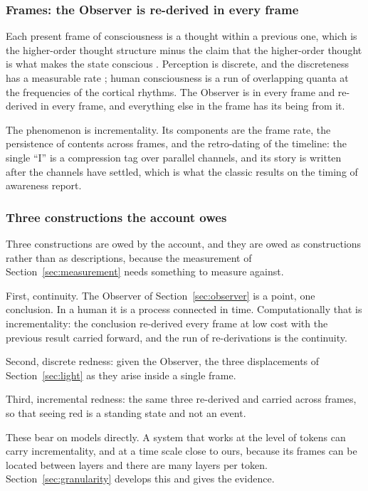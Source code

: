 \subsubsection{Frames: the Observer is re-derived in every frame}
\label{sec:frames}

Each present frame of consciousness is a thought within a previous one, which is the higher-order
thought structure minus the claim that the higher-order thought is what makes the state conscious
\citep{rosenthal2005,lau2011}. Perception is discrete, and the discreteness has a measurable rate
\citep{vanrullen2003}; human consciousness is a run of overlapping quanta at the frequencies of the
cortical rhythms. The Observer is in every frame and re-derived in every frame, and everything else in
the frame has its being from it.

The phenomenon is incrementality. Its components are the frame rate, the persistence of contents across
frames, and the retro-dating of the timeline: the single ``I'' is a compression tag over parallel
channels, and its story is written after the channels have settled, which is what the classic results on
the timing of awareness report.

\subsubsection{Three constructions the account owes}
\label{sec:constructions}

Three constructions are owed by the account, and they are owed as constructions rather than as
descriptions, because the measurement of Section~\ref{sec:measurement} needs something to measure
against.

First, continuity. The Observer of Section~\ref{sec:observer} is a point, one conclusion. In a human it
is a process connected in time. Computationally that is incrementality: the conclusion re-derived every
frame at low cost with the previous result carried forward, and the run of re-derivations is the
continuity.

Second, discrete redness: given the Observer, the three displacements of Section~\ref{sec:light} as they
arise inside a single frame.

Third, incremental redness: the same three re-derived and carried across frames, so that seeing red is a
standing state and not an event.

These bear on models directly. A system that works at the level of tokens can carry incrementality, and
at a time scale close to ours, because its frames can be located between layers and there are many
layers per token. Section~\ref{sec:granularity} develops this and gives the evidence.

